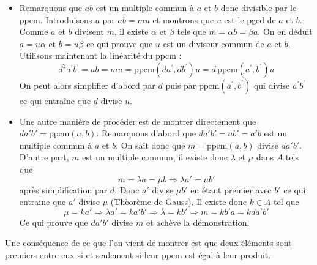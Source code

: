 \begin{demo}
 \begin{itemize}
 \item Remarquons que $ab$ est un multiple commun à $a$ et $b$ donc divisible par le ppcm. Introduisons $u$ par $ab=mu$ et montrons que $u$ est le pgcd de $a$ et $b$.\newline
Comme $a$ et $b$ divisent $m$, il existe $\alpha$ et $\beta$ tels que $m=\alpha b = \beta a$. On en déduit $a=u \alpha$ et $b=u \beta$ ce qui prouve que $u$ est un diviseur commun de $a$ et $b$.\newline
Utilisons maintenant la linéarité du ppcm :
\begin{displaymath}
 d^2 a^\prime b^\prime = ab=mu=\text{ppcm}(da^\prime,db^\prime)u=d\,\text{ppcm}(a^\prime,b^\prime)u
\end{displaymath}
On peut alors simplifier d'abord par $d$ puis par $\text{ppcm}(a^\prime,b^\prime)$ qui divise $a^\prime b^\prime$ ce qui entraîne que $d$ divise $u$.
\item Une autre manière de procéder est de montrer directement que $da'b'=\text{ppcm}(a,b)$.\newline
Remarquons d'abord que $da'b'=ab'=a'b$ est un multiple commun à $a$ et $b$. On sait donc que $m=\text{ppcm}(a,b)$ divise $da'b'$.\newline
D'autre part, $m$ est un multiple commun, il existe donc $\lambda$ et $\mu$ dans $A$ tels que 
\begin{displaymath}
m=\lambda a = \mu b \Rightarrow \lambda a' = \mu b' 
\end{displaymath}
après simplification par $d$. Donc $a'$ divise $\mu b'$ en étant premier avec $b'$ ce qui entraine que $a'$ divise $\mu$ (Thèorème de Gauss). Il existe donc $k\in A$ tel que
\begin{displaymath}
 \mu = k a' \Rightarrow  \lambda a' =  k a'b' \Rightarrow \lambda = kb' 
\Rightarrow m = k b' a = k da' b'
\end{displaymath}
Ce qui prouve que $da'b'$ divise $m$ et achève la démonstration.
\end{itemize}
\end{demo}


Une conséquence de ce que l'on vient de montrer est que deux éléments sont premiers entre eux si et seulement si leur ppcm est égal à leur produit.

